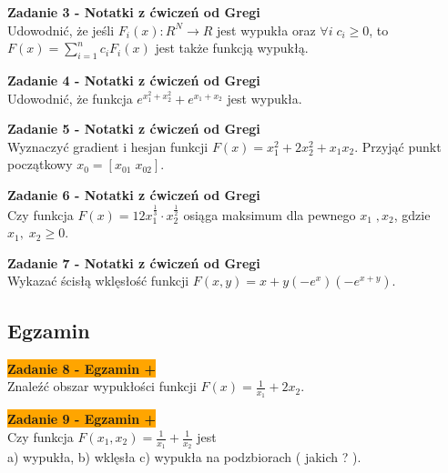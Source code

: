 \documentclass[a4paper,11pt]{article}
\begin{document}
\begin{framed}
\textbf{Zadanie 3 - Notatki z ćwiczeń od Gregi} \\
Udowodnić, że jeśli \( F_i(x) : R^N \rightarrow R \) jest wypukła oraz \( \forall i \; c_i \geq 0 \), to \( F(x) = \sum_{i=1}^n c_i F_i(x) \) jest także funkcją wypukłą. 
\end{framed}

\begin{framed}
\textbf{Zadanie 4 - Notatki z ćwiczeń od Gregi} \\
Udowodnić, że funkcja \( e^{x_1^2+x_2^2} + e^{x_1+x_2} \) jest wypukła. 
\end{framed}

\begin{framed}
\textbf{Zadanie 5 - Notatki z ćwiczeń od Gregi} \\
Wyznaczyć gradient i hesjan funkcji \( F(x)=x_1^2+2x_2^2+x_1x_2 \). Przyjąć punkt początkowy \( x_0 = [ x_{01} \; x_{02} ] \). 
\end{framed}

\begin{framed}
\textbf{Zadanie 6 - Notatki z ćwiczeń od Gregi} \\
Czy funkcja \( F(x)=12x_1^{\frac{1}{3}} \cdot x_2^{\frac{1}{2}} \) osiąga maksimum dla pewnego \( x_1 \; , x_2 \), gdzie \( x_1, \; x_2 \geq 0 \).
\end{framed}

\begin{framed}
\textbf{Zadanie 7 - Notatki z ćwiczeń od Gregi} \\
Wykazać ścisłą wklęsłość funkcji \( F(x,y) = x+y(-e^x)(-e^{x+y}) \).
\end{framed}

\subsection{Egzamin}

\begin{framed}
\textbf{\colorbox{orange}{Zadanie 8 - Egzamin +}} \\
Znaleźć obszar wypukłości funkcji \( F(x)=\frac{1}{x_1}+2x_2 \).
\end{framed}

\begin{framed}
\textbf{\colorbox{orange}{Zadanie 9 - Egzamin +}} \\
Czy funkcja \( F(x_1,x_2)=\frac{1}{x_1}+\frac{1}{x_2} \) jest \\ a) wypukła, b) wklęsła c) wypukła na podzbiorach ( jakich ? ).
\end{framed}
\end{document}
